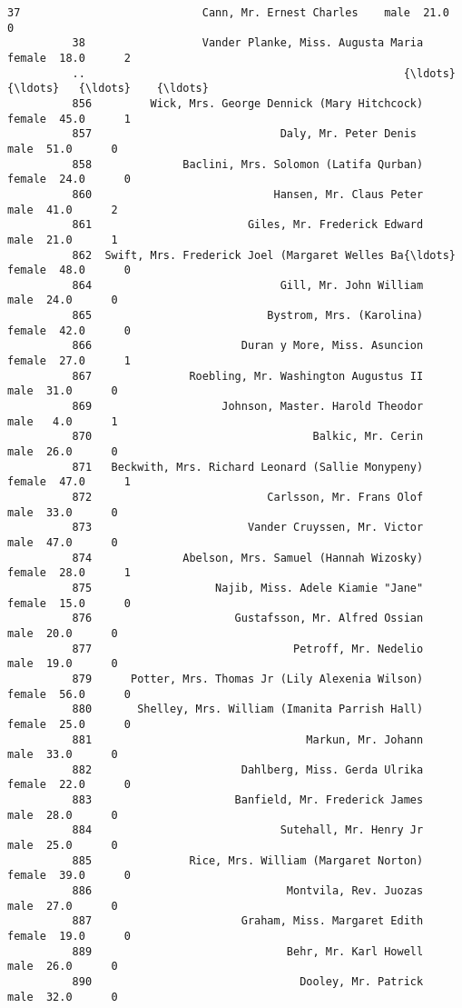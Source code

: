 \documentclass[11pt]{article}
\begin{document}
\begin{Verbatim}[commandchars=\\\{\}]
          37                            Cann, Mr. Ernest Charles    male  21.0      0   
          38                  Vander Planke, Miss. Augusta Maria  female  18.0      2   
          ..                                                 {\ldots}     {\ldots}   {\ldots}    {\ldots}   
          856         Wick, Mrs. George Dennick (Mary Hitchcock)  female  45.0      1   
          857                             Daly, Mr. Peter Denis     male  51.0      0   
          858              Baclini, Mrs. Solomon (Latifa Qurban)  female  24.0      0   
          860                            Hansen, Mr. Claus Peter    male  41.0      2   
          861                        Giles, Mr. Frederick Edward    male  21.0      1   
          862  Swift, Mrs. Frederick Joel (Margaret Welles Ba{\ldots}  female  48.0      0   
          864                             Gill, Mr. John William    male  24.0      0   
          865                           Bystrom, Mrs. (Karolina)  female  42.0      0   
          866                       Duran y More, Miss. Asuncion  female  27.0      1   
          867               Roebling, Mr. Washington Augustus II    male  31.0      0   
          869                    Johnson, Master. Harold Theodor    male   4.0      1   
          870                                  Balkic, Mr. Cerin    male  26.0      0   
          871   Beckwith, Mrs. Richard Leonard (Sallie Monypeny)  female  47.0      1   
          872                           Carlsson, Mr. Frans Olof    male  33.0      0   
          873                        Vander Cruyssen, Mr. Victor    male  47.0      0   
          874              Abelson, Mrs. Samuel (Hannah Wizosky)  female  28.0      1   
          875                   Najib, Miss. Adele Kiamie "Jane"  female  15.0      0   
          876                      Gustafsson, Mr. Alfred Ossian    male  20.0      0   
          877                               Petroff, Mr. Nedelio    male  19.0      0   
          879      Potter, Mrs. Thomas Jr (Lily Alexenia Wilson)  female  56.0      0   
          880       Shelley, Mrs. William (Imanita Parrish Hall)  female  25.0      0   
          881                                 Markun, Mr. Johann    male  33.0      0   
          882                       Dahlberg, Miss. Gerda Ulrika  female  22.0      0   
          883                      Banfield, Mr. Frederick James    male  28.0      0   
          884                             Sutehall, Mr. Henry Jr    male  25.0      0   
          885               Rice, Mrs. William (Margaret Norton)  female  39.0      0   
          886                              Montvila, Rev. Juozas    male  27.0      0   
          887                       Graham, Miss. Margaret Edith  female  19.0      0   
          889                              Behr, Mr. Karl Howell    male  26.0      0   
          890                                Dooley, Mr. Patrick    male  32.0      0   
          

\end{Verbatim}
\end{document}
